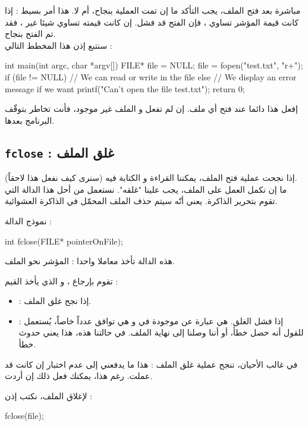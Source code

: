 مباشرة بعد فتح الملف، يجب التأكد ما إن تمت العملية بنجاح، أم لا. هذا أمر بسيط : إذا كانت قيمة المؤشر تساوي
،
فإن الفتح قد فشل. إن كانت قيمته تساوي شيئا غير
،
فقد تم الفتح بنجاح.\\
سنتبع إذن هذا المخطط التالي :

\begin{Csource}
int main(int argc, char *argv[])
{
	FILE* file = NULL;
	file = fopen("test.txt", "r+");
	if (file != NULL)
	{
    		// We can read or write in the file
	}
	else
	{
    		// We display an error message if we want
    		printf("Can't open the file test.txt");
	}
	return 0;
}
\end{Csource}

إفعل هذا دائما عند فتح أي ملف. إن لم تفعل و الملف غير موجود، فأنت تخاطر بتوقّف البرنامج بعدها.

\subsection{\texttt{fclose} : غلق الملف}
إذا نجحت عملية فتح الملف، يمكننا القراءة و الكتابة فيه (سنرى كيف نفعل هذا لاحقاً).\\
ما إن نكمل العمل على الملف، يجب علينا "غلقه". نستعمل من أحل هذا الدالة
التي تقوم بتحرير الذاكرة. يعني أنّه سيتم حذف الملف المحمّل في الذاكرة العشوائية.

نموذج الدالة :

\begin{Csource}
int fclose(FILE* pointerOnFile);
\end{Csource}

هذه الدالة تأخذ معاملا واحدا : المؤشر نحو الملف.

تقوم بإرجاع
،
و الذي يأخذ القيم :
\begin{itemize}
  \item {} : إذا نجح غلق الملف.
  \item {} : إذا فشل الغلق.
هي عبارة عن
موجودة في
و هي توافق عدداً خاصاً، يُستعمل للقول أنه حصل خطأ، أو أننا وصلنا إلى نهاية الملف. في حالتنا هذه، هذا يعني حدوث خطأ.
\end{itemize}

في غالب الأحيان، تنجح عملية غلق الملف : هذا ما يدفعني إلى عدم اختبار إن كانت
قد عملت. رغم هذا، يمكنك فعل ذلك إن أردت.

لإغلاق الملف، نكتب إذن :

\begin{Csource}
fclose(file);
\end{Csource}

